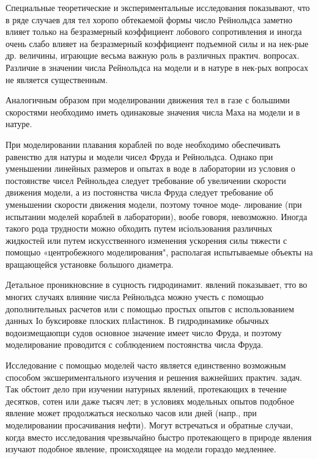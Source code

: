 \documentclass[10pt]{article}
\begin{document}
Специальные теоретические и экспериментальные исследования показывают, что в ряде случаев для тел хоропо обтекаемой формы число Рейнольдса заметно влияет только на безразмерный коэффициент лобового сопротивления и иногда очень слабо влияет на безразмерный коэффициент подъемной силы и на нек-рые др. величины, играющие весьма важную роль в различных практич. вопросах. Различие в значении числа Рейнольдса на модели и в натуре в нек-рых вопросах не является существенным.



Аналогичным образом при моделировании движения тел в газе с большими скоростями необходимо иметь одинаковые значения числа Маха на модели и в натуре.



При моделировании плавания кораблей по воде необходимо обеспечивать равенство для натуры и модели чисел Фруда и Рейнольдса. Однако при уменьшении линейных размеров и опытах в воде в лаборатории из условия о постоянстве чисел Рейнольдеа следует требование об увеличении скорости движения модели, а из постоянства числа Фруда следует требование об уменьшении скорости движения модели, поэтому точное моде- лирование (при испытании моделей кораблей в лаборатории), вообе говоря, невозможно. Иногда такого рода трудности можно обходить путем исіользования различных жидкостей или путем искусственного изменения ускорения силы тяжести с помощыо «центробежного моделирования", располагая испытываемые объекты на вращающейся установке большого диаметра.



Детальное проникновсние в суцность гидродинамит. явлений показывает, тто во многих случаях влияние числа Рейнольдса можно учесть с помощью дополнительных расчетов или с помощью простых опытов с использованием данных Іо буксировке плоских плІастинок. В гидродинамике обычных водоизмещаюпци судов основное значение имеет число Фруда, и поэтому моделирование проводится с соблюдением постоянства числа Фруда.



Исследование с помощью моделей часто является единственно возможным способом эксшериментального изучения и решения важнейших практич. задач. Так обстоит дело при изучении натурных явлений, протекающих в течение десятков, сотен или даже тысяч лет; в условиях модельных опытов подобное явление может продолжаться несколько часов или дней (напр., при моделировании просачивания нефти). Могут встречаться и обратные случаи, когда вместо исследования чрезвычайно быстро протекающего в природе явления изучают подобное явление, происходящее на модели гораздо медленнее.
\end{document}
